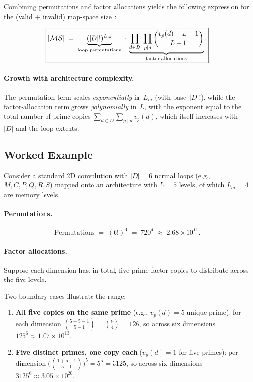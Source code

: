 Combining permutations and factor allocations yields the following
expression for the (valid + invalid) map-space
size~\cite{ronzani2025quickflow}:

\begin{equation}
\label{eq:ms-cardinality}
\boxed{%
  |\mathcal{MS}|
  \;=\;
  \underbrace{(|D|!)^{L_m}}_{\text{loop permutations}}
  \;\cdot\;
  \underbrace{
    \prod_{d \in D}\;\prod_{p \mid d}
      \binom{v_p(d) + L - 1}{L - 1}
  }_{\text{factor allocations}}.
}
\end{equation}

\paragraph{Growth with architecture complexity.}
The permutation term scales \emph{exponentially} in~$L_m$ (with
base~$|D|!$), while the factor-allocation term grows
\emph{polynomially} in~$L$, with the exponent equal to the total
number of prime copies
$\sum_{d \in D}\sum_{p \mid d} v_p(d)$,
which itself increases with~$|D|$ and the loop extents.


\subsection{Worked Example}
\label{sec:mapspace-example}

Consider a standard 2D convolution with $|D| = 6$ normal loops
(e.g., $M, C, P, Q, R, S$) mapped onto an architecture with $L = 5$
levels, of which $L_m = 4$ are memory levels.

\paragraph{Permutations.}
\[
  \text{Permutations}
  \;=\; (6!)^{4}
  \;=\; 720^{4}
  \;\approx\; 2.68 \times 10^{11}.
\]

\paragraph{Factor allocations.}
Suppose each dimension has, in total, five prime-factor copies to
distribute across the five levels.

Two boundary cases illustrate the range:

\begin{enumerate}
  \item \textbf{All five copies on the same prime}
    (e.g., $v_p(d) = 5$ unique prime):
for each dimension
    $\binom{5 + 5 - 1}{5 - 1} = \binom{9}{4} = 126$,
    so across six dimensions $126^{6} \approx 1.07 \times 10^{13}$.

  \item \textbf{Five distinct primes, one copy each}
    ($v_{p}(d) = 1$ for five primes):
    per dimension
    $\bigl(\binom{1 + 5 - 1}{5 - 1}\bigr)^{5} = 5^{5} = 3125$,
    so across six dimensions $3125^{6} \approx 3.05 \times 10^{20}$.
\end{enumerate}


